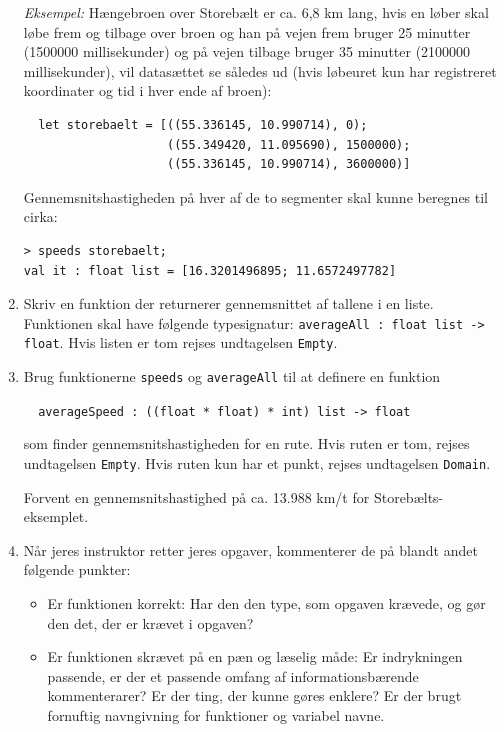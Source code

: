 \documentclass[a4paper,12pt]{article}
\begin{document}
\begin{enumerate}[{2}G1]
  \textit{Eksempel:} Hængebroen over Storebælt er ca. 6,8 km lang,
  hvis en løber skal løbe frem og tilbage over broen og han på vejen
  frem bruger 25 minutter (1500000 millisekunder) og på vejen tilbage
  bruger 35 minutter (2100000 millisekunder), vil datasættet se
  således ud (hvis løbeuret kun har registreret koordinater og tid i hver ende af
  broen):
\begin{verbatim}
  let storebaelt = [((55.336145, 10.990714), 0);
                    ((55.349420, 11.095690), 1500000);
                    ((55.336145, 10.990714), 3600000)]
\end{verbatim}
Gennemsnitshastigheden på hver af de to segmenter skal kunne
beregnes til cirka:
\begin{verbatim}
> speeds storebaelt;
val it : float list = [16.3201496895; 11.6572497782]
\end{verbatim}

\item Skriv en funktion der returnerer gennemsnittet af tallene i en
  liste.  Funktionen skal have følgende typesignatur:
  \verb|averageAll : float list -> float|. Hvis listen er tom rejses
  undtagelsen \verb|Empty|.

\item Brug funktionerne \verb|speeds| og \verb|averageAll| til at
  definere en funktion

  \verb|  averageSpeed : ((float * float) * int) list -> float|

  som finder gennemsnitshastigheden for en rute.  Hvis ruten er tom,
  rejses undtagelsen \verb|Empty|.  Hvis ruten kun har et punkt,
  rejses undtagelsen \verb|Domain|.

  Forvent en gennemsnitshastighed på ca. 13.988 km/t for
  Storebælts-eksemplet.

\item Når jeres instruktor retter jeres opgaver, kommenterer de på
  blandt andet følgende punkter:

\begin{itemize}

\item Er funktionen korrekt: Har den den type, som opgaven krævede, og
  gør den det, der er krævet i opgaven?

\item Er funktionen skrævet på en pæn og læselig måde: Er indrykningen
  passende, er der et passende omfang af informationsbærende
  kommenterarer?  Er der ting, der kunne gøres enklere? Er der brugt
  fornuftig navngivning for funktioner og variabel navne.


\end{itemize}
\end{enumerate}
\end{document}
